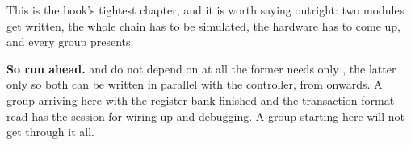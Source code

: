 \begin{warning}
This is the book's tightest chapter, and it is worth saying outright: two modules get written, the
whole chain has to be simulated, the hardware has to come up, and every group presents.

\textbf{So run ahead.}  and  do not depend on
 at all \textemdash{} the former needs only , the latter only
 \textemdash{} so both can be written in parallel with the controller, from
 onwards. A group arriving here with the register bank finished and the transaction
format read has the session for wiring up and debugging. A group starting here will not get through
it all.
\end{warning}






